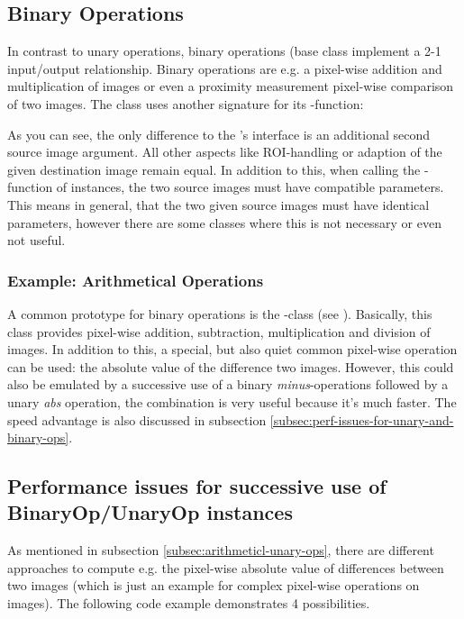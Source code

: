 
\subsection{Binary Operations\label{subsec:binary-ops}}
In contrast to unary operations, binary operations (base class  implement a 2-1 input/output relationship. Binary operations are e.g. a pixel-wise addition and multiplication of images or even a proximity measurement pixel-wise comparison of two images. The  class uses another signature for its -function:


As you can see, the only difference to the 's interface is an additional second source image argument. All other aspects like ROI-handling or adaption of the given destination image remain equal. In addition to this, when calling the -function of  instances, the two source images must have compatible parameters. This means in general, that the two given source images must have identical parameters, however there are some classes where this is not necessary or even not useful.

\subsubsection{Example: Arithmetical Operations\label{subsec:arithmeticl-unary-ops}}
A common prototype for binary operations is the -class (see ). Basically, this class provides pixel-wise addition, subtraction, multiplication and division of images. In addition to this, a special, but also quiet common pixel-wise operation can be used: the absolute value of the difference two images. However, this could also be emulated by a successive use of a binary \emph{minus}-operations followed by a unary \emph{abs} operation, the combination is very useful because it's much faster. The speed advantage is also discussed in subsection \ref{subsec:perf-issues-for-unary-and-binary-ops}.

\subsection{Performance issues for successive use of BinaryOp/UnaryOp instances\label{subsec:perf-issues-for-unary-and-binary-ops}}
As mentioned in subsection \ref{subsec:arithmeticl-unary-ops}, there are different approaches to compute e.g. the pixel-wise absolute value of differences between two images (which is just an example for complex pixel-wise operations on images). The following code example demonstrates 4 possibilities.


